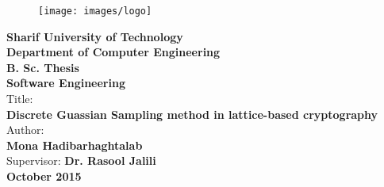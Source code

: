\clearpage
\thispagestyle{empty}
\begin{latin}
\vspace*{-2cm}
\begin{figure}
\centerline{\texttt{[image: images/logo]}}
\end{figure}
\vspace{0.5cm}
\begin{center}
{\large\bf  Sharif University of Technology  }\\
{\large \bf  Department of Computer Engineering}\\
\vspace{0.2cm}
{\large\bf  B. Sc. Thesis  }\\
{\large \bf  Software Engineering}\\
\vspace{1.2cm}
Title:\\
{\Huge \bf Discrete Guassian Sampling method in lattice-based cryptography}\vspace{0.5cm}\\
Author:\vspace{0.3cm}\\
{\LARGE  \bf Mona Hadibarhaghtalab}\\
\vspace{0.5cm}
Supervisor: {\Large \bf Dr. Rasool Jalili
}\\
\vspace{1cm}
{\large \bf October 2015}
\end{center}
\end{latin}
